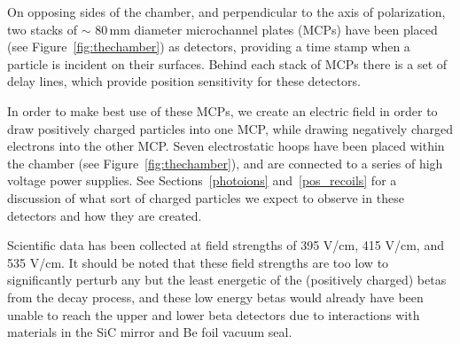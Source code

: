 On opposing sides of the chamber, and perpendicular to the axis of polarization, two stacks of $\sim$ 80\,mm diameter microchannel plates (MCPs) have been placed (see Figure~\ref{fig:thechamber}) as detectors, providing a time stamp when a particle is incident on their surfaces.  Behind each stack of MCPs there is a set of delay lines, which provide  position sensitivity for these detectors.   

In order to make best use of these MCPs, we create an electric field in order to draw positively charged particles into one MCP, while drawing negatively charged electrons into the other MCP.  Seven electrostatic hoops have been placed within the chamber (see Figure~\ref{fig:thechamber}), and are connected to a series of high voltage power supplies.  See Sections~\ref{photoions} and~\ref{pos_recoils} for a discussion of what sort of charged particles we expect to observe in these detectors and how they are created.  
  
Scientific data has been collected at field strengths of 395 V/cm, 415 V/cm, and 535 V/cm.  It should be noted that these field strengths are too low to significantly perturb any but the least energetic of the (positively charged) betas from the decay process, and these low energy betas would already have been unable to reach the upper and lower beta detectors due to interactions with materials in the SiC mirror and Be foil vacuum seal.  

